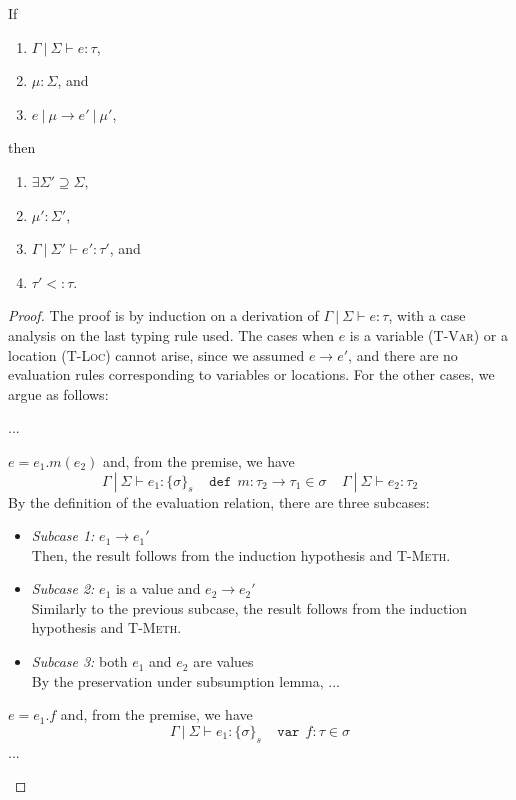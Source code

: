 \documentclass{llncs}
\newcommand{\keywadj}[1]{\mathtt{#1}}
\newcommand{\keyw}[1]{\keywadj{#1}~}
\newcommand{\pcase}[1][]{
  \if\relax\detokenize{#1}\relax
    \def\thiscase{}
  \else
    \def\thiscase{~#1}
  \fi
  \item
}
\begin{document}
\vspace{8pt}

\begin{theorem}[Preservation]
If
\begin{enumerate}
\item $\Gamma~|~\Sigma \vdash e : \tau$,
\item $\mu : \Sigma$, and
\item $e~|~\mu \longrightarrow e'~|~\mu'$,
\end{enumerate}
then
\begin{enumerate}
\item $\exists \Sigma' \supseteq \Sigma$,
\item $\mu' : \Sigma'$,
\item $\Gamma~|~\Sigma' \vdash e' : \tau'$, and
\item $\tau'<:\tau$.
\end{enumerate}

\end{theorem}

\begin{proof} The proof is by induction on a derivation of $\Gamma~|~\Sigma \vdash e : \tau$, with a case analysis on the last typing rule used. The cases when $e$ is a variable (\textsc{T-Var}) or a location (\textsc{T-Loc}) cannot arise, since we assumed $e \longrightarrow e'$, and there are no evaluation rules corresponding to variables or locations. For the other cases, we argue as follows:

\begin{pcases}
\pcase[\textsc{T-New}] ...
\\
\pcase[\textsc{T-Meth}]
$e = e_1.m(e_2)$ and, from the premise, we have
\[
\Gamma~|~\Sigma \vdash e_1 : \{\sigma\}_s~~~~~\keyw{def}~ m : \tau_2 \rightarrow \tau_1 \in \sigma~~~~~\Gamma~|~\Sigma \vdash e_2 : \tau_2
\]
By the definition of the evaluation relation, there are three subcases:
\\
\begin{itemize}
\item[]  \textit{Subcase 1:} $e_1 \longrightarrow e_1'$
\\
Then, the result follows from the induction hypothesis and \textsc{T-Meth}.
\\
\item[]  \textit{Subcase 2:} $e_1$ is a value and $e_2 \longrightarrow e_2'$
\\
Similarly to the previous subcase, the result follows from the induction hypothesis and \textsc{T-Meth}.
\\
\item[]  \textit{Subcase 3:} both $e_1$ and $e_2$ are values
\\
By the preservation under subsumption lemma, ...
\\
\end{itemize}

\pcase[\textsc{T-Field}]
$e = e_1.f$ and, from the premise, we have
\[
\Gamma~|~\Sigma \vdash e_1 : \{\sigma\}_s~~~~~\keyw{var}~ f : \tau \in \sigma
\]
...
\\
\end{pcases}

\end{proof}
\end{document}

